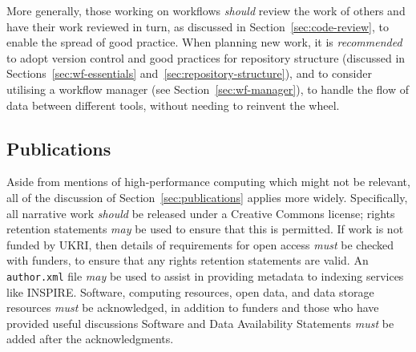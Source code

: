 \documentclass{article}
\newcommand\rfcword[1]{\emph{#1}\xspace}
\newcommand\must{\rfcword{must}}
\newcommand\should{\rfcword{should}}
\newcommand\recommended{\rfcword{recommended}}
\newcommand\may{\rfcword{may}}
\newcommand\filename[1]{\texttt{#1}\xspace}
\newcommand\authorxml{\filename{author.xml}}
\begin{document}
More generally,
those working on workflows \should review the work of others
and have their work reviewed in turn,
as discussed in Section~\ref{sec:code-review},
to enable the spread of good practice.
When planning new work,
it is \recommended to adopt version control and good practices for repository structure
(discussed in Sections~\ref{sec:wf-essentials} and~\ref{sec:repository-structure}),
and to consider utilising a workflow manager
(see Section~\ref{sec:wf-manager}),
to handle the flow of data between different tools,
without needing to reinvent the wheel.

\subsection{Publications}

Aside from mentions of high-performance computing which might not be relevant,
all of the discussion of Section~\ref{sec:publications} applies more widely.
Specifically,
all narrative work \should be released under a Creative Commons license;
rights retention statements \may be used to ensure that this is permitted.
If work is not funded by UKRI,
then details of requirements for open access \must be checked with funders,
to ensure that any rights retention statements are valid.
An \authorxml file \may be used
to assist in providing metadata to indexing services like INSPIRE\@.
Software,
computing resources,
open data,
and data storage resources \must be acknowledged,
in addition to funders and those who have provided useful discussions
Software and Data Availability Statements \must be added after the acknowledgments.
\end{document}
